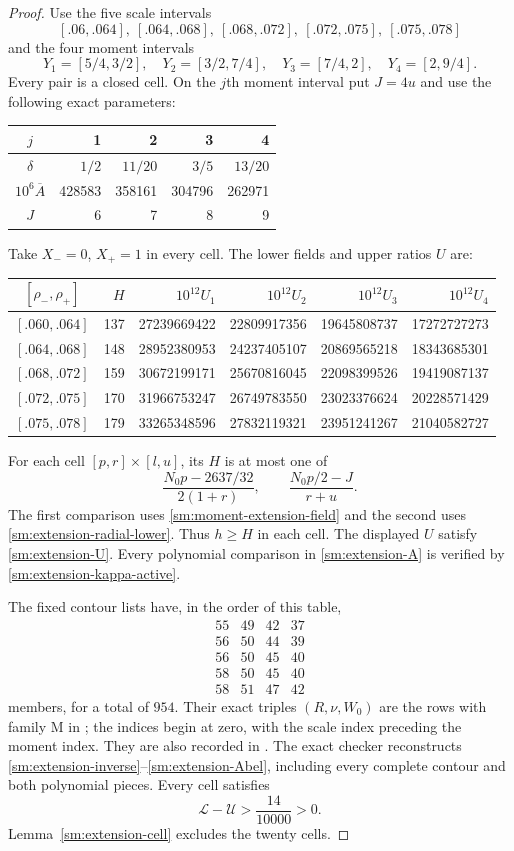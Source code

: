 \begin{proof}
Use the five scale intervals
\[
 [.06,.064],\ [.064,.068],\ [.068,.072],\
 [.072,.075],\ [.075,.078]
\]
and the four moment intervals
\[
 Y_1=[5/4,3/2],\quad Y_2=[3/2,7/4],\quad
 Y_3=[7/4,2],\quad Y_4=[2,9/4].
\]
Every pair is a closed cell. On the $j$th moment interval
put $J=4u$ and use the following exact parameters:
\begin{center}
\begin{tabular}{c|rrrr}
\toprule
$j$&1&2&3&4\\\midrule
$\delta$&$1/2$&$11/20$&$3/5$&$13/20$\\
$10^6\overline A$&428583&358161&304796&262971\\
$J$&6&7&8&9\\
\bottomrule
\end{tabular}
\end{center}
Take $X_-=0$, $X_+=1$ in every cell. The lower fields and upper
ratios $U$ are:
\begin{center}\small
\begin{tabular}{c|r|rrrr}
\toprule
$[\rho_-,\rho_+]$&$H$&
$10^{12}U_1$&$10^{12}U_2$&$10^{12}U_3$&$10^{12}U_4$\\
\midrule
$[.060,.064]$&137&27239669422&22809917356&19645808737&17272727273\\
$[.064,.068]$&148&28952380953&24237405107&20869565218&18343685301\\
$[.068,.072]$&159&30672199171&25670816045&22098399526&19419087137\\
$[.072,.075]$&170&31966753247&26749783550&23023376624&20228571429\\
$[.075,.078]$&179&33265348596&27832119321&23951241267&21040582727\\
\bottomrule
\end{tabular}
\end{center}
For each cell $[p,r]\times[l,u]$, its $H$ is at most one of
\[
 \frac{N_0p-2637/32}{2(1+r)},\qquad
 \frac{N_0p/2-J}{r+u}.
\]
The first comparison uses \eqref{sm:moment-extension-field}
and the second uses \eqref{sm:extension-radial-lower}.
Thus $h\ge H$ in each cell.
The displayed $U$ satisfy \eqref{sm:extension-U}.
Every polynomial comparison in \eqref{sm:extension-A} is
verified by \eqref{sm:extension-kappa-active}.

The fixed contour lists have, in the order of this table,
\[
\begin{array}{rrrr}
55&49&42&37\\
56&50&44&39\\
56&50&45&40\\
58&50&45&40\\
58&51&47&42
\end{array}
\]
members, for a total of $954$.
Their exact triples $(R,\nu,W_0)$ are the rows with family
\textup{M} in
;
the indices begin at zero, with the scale index preceding the
moment index. They are also recorded in
.
The exact checker 
reconstructs \eqref{sm:extension-inverse}--\eqref{sm:extension-Abel},
including every complete contour and both polynomial pieces.
Every cell satisfies
\[
 \mathcal L-\mathcal U>\frac{14}{10000}>0.
\]
Lemma~\ref{sm:extension-cell} excludes the twenty cells.


\end{proof}
